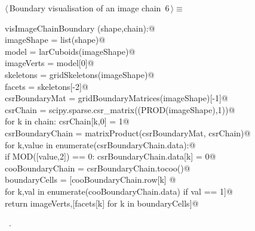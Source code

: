 \documentclass[11pt,oneside]{article}	%
\begin{document}
\begin{flushleft} \small
\begin{minipage}{\linewidth} \label{scrap9}
\protect{}$\langle\,$Boundary visualisation of an image chain\nobreak\ {\footnotesize 6}$\,\rangle\equiv$
\vspace{-1ex}
\begin{list}{}{} \item
\mbox{}\verb@def visImageChainBoundary (shape,chain):@\\
\mbox{}\verb@   imageShape = list(shape)@\\
\mbox{}\verb@   model = larCuboids(imageShape)@\\
\mbox{}\verb@   imageVerts = model[0]@\\
\mbox{}\verb@   skeletons = gridSkeletons(imageShape)@\\
\mbox{}\verb@   facets = skeletons[-2]@\\
\mbox{}\verb@   csrBoundaryMat = gridBoundaryMatrices(imageShape)[-1]@\\
\mbox{}\verb@   csrChain = scipy.sparse.csr_matrix((PROD(imageShape),1))@\\
\mbox{}\verb@   for k in chain: csrChain[k,0] = 1@\\
\mbox{}\verb@   csrBoundaryChain = matrixProduct(csrBoundaryMat, csrChain)@\\
\mbox{}\verb@   for k,value in enumerate(csrBoundaryChain.data):@\\
\mbox{}\verb@      if MOD([value,2]) == 0: csrBoundaryChain.data[k] = 0@\\
\mbox{}\verb@   cooBoundaryChain = csrBoundaryChain.tocoo()@\\
\mbox{}\verb@   boundaryCells = [cooBoundaryChain.row[k] @\\
\mbox{}\verb@      for k,val in enumerate(cooBoundaryChain.data) if val == 1]@\\
\mbox{}\verb@   return imageVerts,[facets[k] for k in boundaryCells]@\\
\mbox{}\verb@@{\NWsep}
\end{list}
\vspace{-1ex}
\footnotesize\addtolength{\baselineskip}{-1ex}
\begin{list}{}{\setlength{\itemsep}{-\parsep}\setlength{\itemindent}{-\leftmargin}}
\item \NWtxtMacroRefIn\ .
\end{list}
\end{minipage}\\[4ex]
\end{flushleft}
\end{document}
